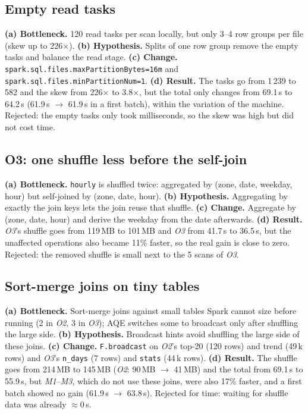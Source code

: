 \documentclass[10pt,a4paper]{article}
\begin{document}
\subsection{Empty read tasks}
\textbf{(a) Bottleneck.} 120 read tasks per scan locally, but only 3--4 row groups per file (skew up to 226$\times$).
\textbf{(b) Hypothesis.} Splits of one row group remove the empty tasks and balance the read stage.
\textbf{(c) Change.} \texttt{spark.sql.files.maxPartitionBytes=16m} and \texttt{spark.sql.files.minPartitionNum=1}.
\textbf{(d) Result.} The tasks go from 1\,239 to 582 and the skew from 226$\times$ to 3.8$\times$, but the total only changes from 69.1\,s to 64.2\,s (61.9\,s $\rightarrow$ 61.9\,s in a first batch), within the variation of the machine. Rejected: the empty tasks only took milliseconds, so the skew was high but did not cost time.

\subsection{O3: one shuffle less before the self-join}
\textbf{(a) Bottleneck.} \texttt{hourly} is shuffled twice: aggregated by (zone, date, weekday, hour) but self-joined by (zone, date, hour).
\textbf{(b) Hypothesis.} Aggregating by exactly the join keys lets the join reuse that shuffle.
\textbf{(c) Change.} Aggregate by (zone, date, hour) and derive the weekday from the date afterwards.
\textbf{(d) Result.} \textit{O3}'s shuffle goes from 119\,MB to 101\,MB and \textit{O3} from 41.7\,s to 36.5\,s, but the unaffected operations also became 11\% faster, so the real gain is close to zero. Rejected: the removed shuffle is small next to the 5 scans of \textit{O3}.

\subsection{Sort-merge joins on tiny tables}
\textbf{(a) Bottleneck.} Sort-merge joins against small tables Spark cannot size before running (2 in \textit{O2}, 3 in \textit{O3}); AQE switches some to broadcast only after shuffling the large side.
\textbf{(b) Hypothesis.} Broadcast hints avoid shuffling the large side of these joins.
\textbf{(c) Change.} \texttt{F.broadcast} on \textit{O2}'s top-20 (120 rows) and trend (49\,k rows) and \textit{O3}'s \texttt{n\_days} (7 rows) and \texttt{stats} (44\,k rows).
\textbf{(d) Result.} The shuffle goes from 214\,MB to 145\,MB (\textit{O2}: 90\,MB $\rightarrow$ 41\,MB) and the total from 69.1\,s to 55.9\,s, but \textit{M1}--\textit{M3}, which do not use these joins, were also 17\% faster, and a first batch showed no gain (61.9\,s $\rightarrow$ 63.8\,s). Rejected for time: waiting for shuffle data was already $\approx$0\,s.
\end{document}
